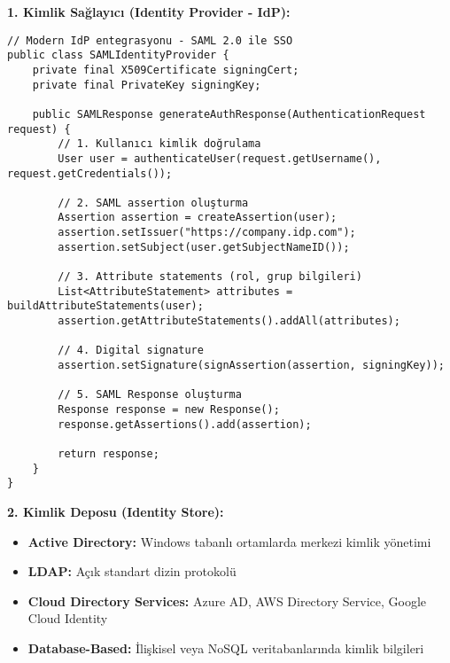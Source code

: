 \textbf{1. Kimlik Sağlayıcı (Identity Provider - IdP):}
\begin{lstlisting}[breaklines=true,basicstyle=\ttfamily\footnotesize]
// Modern IdP entegrasyonu - SAML 2.0 ile SSO
public class SAMLIdentityProvider {
    private final X509Certificate signingCert;
    private final PrivateKey signingKey;
    
    public SAMLResponse generateAuthResponse(AuthenticationRequest request) {
        // 1. Kullanıcı kimlik doğrulama
        User user = authenticateUser(request.getUsername(), request.getCredentials());
        
        // 2. SAML assertion oluşturma
        Assertion assertion = createAssertion(user);
        assertion.setIssuer("https://company.idp.com");
        assertion.setSubject(user.getSubjectNameID());
        
        // 3. Attribute statements (rol, grup bilgileri)
        List<AttributeStatement> attributes = buildAttributeStatements(user);
        assertion.getAttributeStatements().addAll(attributes);
        
        // 4. Digital signature
        assertion.setSignature(signAssertion(assertion, signingKey));
        
        // 5. SAML Response oluşturma
        Response response = new Response();
        response.getAssertions().add(assertion);
        
        return response;
    }
}
\end{lstlisting}

\textbf{2. Kimlik Deposu (Identity Store):}
\begin{itemize}
    \item \textbf{Active Directory:} Windows tabanlı ortamlarda merkezi kimlik yönetimi
    \item \textbf{LDAP:} Açık standart dizin protokolü
    \item \textbf{Cloud Directory Services:} Azure AD, AWS Directory Service, Google Cloud Identity
    \item \textbf{Database-Based:} İlişkisel veya NoSQL veritabanlarında kimlik bilgileri
\end{itemize}

